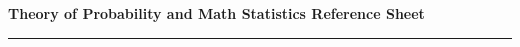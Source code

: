 \documentclass[10pt,landscape,a4paper]{article}
\newcommand{\header}{\begin{center}
		\textbf{Theory of Probability and Math Statistics Reference Sheet}
	\end{center}}
\begin{document}
	\let\displaystyle\textstyle
	\small
	\begin{multicols*}{5}
		\header
		\hrule
		
		
		
		
		
		
		
		
		
		
		
	\end{multicols*}
	
\end{document}
